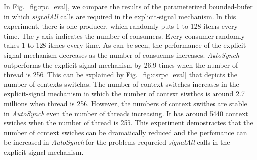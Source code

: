 \documentclass[preprint]{sigplanconf}
\begin{document}
In Fig.~\ref{fig:rpc_eval}, we compare the results of the parameterized 
bounded-bufer in which {\em signalAll} calls are required in the 
explicit-signal mechanism. In this experiment, there is one producer, which
randomly puts 1 to 128 items every time. The y-axis indicates the number of 
consumers. Every consumer randomly takes 1 to 128 itmes every time. As can be
seen, the performance of the explicit-signal mechanism decreases as the number
of consuemrs increases. {\em AutoSynch} outperforms the explicit-signal 
mechanism by 26.9 times when the number of thread is 256. This can be explained 
by Fig.~\ref{fig:csrpc_eval} that depicts the number of contexts switches. The
number of context switches increases in the explicit-signal
mechanism in which the number of context siwthcs is around 2.7 millions when 
thread is 256. However, the numbers of context swithes are stable  in {\em
AutoSynch} even the number of threads increasing. It has around 5440 context
swiches when the number of thread is 256. This experiment demostractes
that the number of context swiches can be dramatically reduced and the
perfomance can be increased in {\em AutoSynch} for the problems requreied 
{\em signalAll} calls in the explicit-signal mechanism. 
\end{document}
